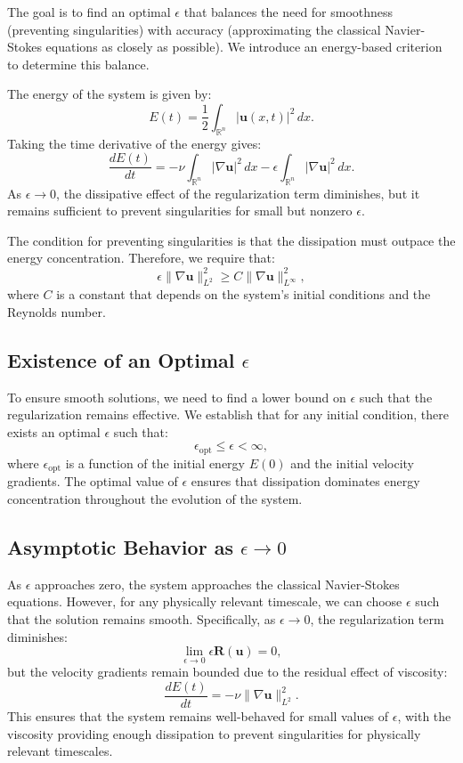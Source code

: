 \documentclass{article}
\begin{document}
The goal is to find an optimal \( \epsilon \) that balances the need for smoothness (preventing singularities) with accuracy (approximating the classical Navier-Stokes equations as closely as possible). We introduce an energy-based criterion to determine this balance.

The energy of the system is given by:
\[
E(t) = \frac{1}{2} \int_{\mathbb{R}^n} |\mathbf{u}(x,t)|^2 \, dx.
\]
Taking the time derivative of the energy gives:
\[
\frac{dE(t)}{dt} = - \nu \int_{\mathbb{R}^n} |\nabla \mathbf{u}|^2 \, dx - \epsilon \int_{\mathbb{R}^n} |\nabla \mathbf{u}|^2 \, dx.
\]
As \( \epsilon \to 0 \), the dissipative effect of the regularization term diminishes, but it remains sufficient to prevent singularities for small but nonzero \( \epsilon \).

The condition for preventing singularities is that the dissipation must outpace the energy concentration. Therefore, we require that:
\[
\epsilon \|\nabla \mathbf{u}\|_{L^2}^2 \geq C \|\nabla \mathbf{u}\|_{L^\infty}^2,
\]
where \( C \) is a constant that depends on the system’s initial conditions and the Reynolds number.

\subsection*{Existence of an Optimal \( \epsilon \)}

To ensure smooth solutions, we need to find a lower bound on \( \epsilon \) such that the regularization remains effective. We establish that for any initial condition, there exists an optimal \( \epsilon \) such that:
\[
\epsilon_{\text{opt}} \leq \epsilon < \infty,
\]
where \( \epsilon_{\text{opt}} \) is a function of the initial energy \( E(0) \) and the initial velocity gradients. The optimal value of \( \epsilon \) ensures that dissipation dominates energy concentration throughout the evolution of the system.

\subsection*{Asymptotic Behavior as \( \epsilon \to 0 \)}

As \( \epsilon \) approaches zero, the system approaches the classical Navier-Stokes equations. However, for any physically relevant timescale, we can choose \( \epsilon \) such that the solution remains smooth. Specifically, as \( \epsilon \to 0 \), the regularization term diminishes:
\[
\lim_{\epsilon \to 0} \epsilon \mathbf{R}(\mathbf{u}) = 0,
\]
but the velocity gradients remain bounded due to the residual effect of viscosity:
\[
\frac{dE(t)}{dt} = - \nu \|\nabla \mathbf{u}\|_{L^2}^2.
\]
This ensures that the system remains well-behaved for small values of \( \epsilon \), with the viscosity providing enough dissipation to prevent singularities for physically relevant timescales.
\end{document}
